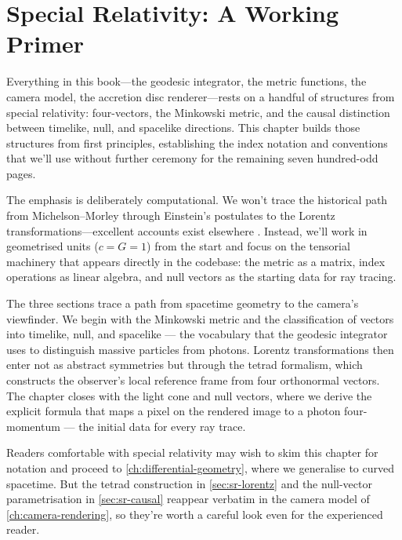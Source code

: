 \chapter{Special Relativity: A Working Primer}
\label{ch:special-relativity}

Everything in this book---the geodesic integrator, the metric functions, the
camera model, the accretion disc renderer---rests on a handful of structures
from special relativity: four-vectors, the Minkowski metric, and the causal
distinction between timelike, null, and spacelike directions.  This
chapter builds those structures from first principles, establishing the index
notation and conventions that we'll use without further ceremony for the
remaining seven hundred-odd pages.

The emphasis is deliberately computational.  We won't trace the historical
path from Michelson--Morley through Einstein's postulates to the Lorentz
transformations---excellent accounts exist elsewhere
\cite{Carroll2004,MTW1973}.  Instead, we'll work in geometrised units ($c = G
= 1$) from the start and focus on the tensorial machinery that appears
directly in the codebase: the metric as a matrix, index operations as linear
algebra, and null vectors as the starting data for ray tracing.

The three sections trace a path from spacetime geometry to the camera's
viewfinder.  We begin with the Minkowski metric and the classification of
vectors into timelike, null, and spacelike --- the vocabulary that the geodesic
integrator uses to distinguish massive particles from photons.  Lorentz
transformations then enter not as abstract symmetries but through the tetrad
formalism, which constructs the observer's local reference frame from four
orthonormal vectors.  The chapter closes with the light cone and null vectors,
where we derive the explicit formula that maps a pixel on the rendered image to
a photon four-momentum --- the initial data for every ray trace.

Readers comfortable with special relativity may wish to skim this chapter for
notation and proceed to \cref{ch:differential-geometry}, where we generalise
to curved spacetime.  But the tetrad construction in \cref{sec:sr-lorentz} and
the null-vector parametrisation in \cref{sec:sr-causal} reappear verbatim in
the camera model of \cref{ch:camera-rendering}, so they're worth a careful
look even for the experienced reader.

